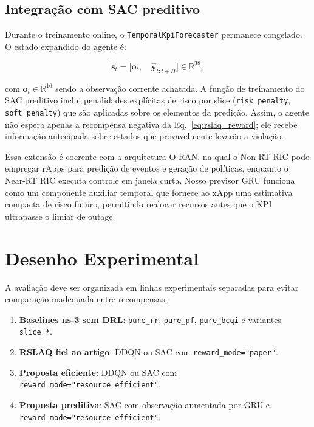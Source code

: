 \documentclass[10pt,a4paper]{IEEEtran}
\begin{document}
\subsection{Integra\c{c}\~{a}o com SAC preditivo}

Durante o treinamento online, o \texttt{TemporalKpiForecaster}
permanece congelado. O estado expandido do agente \'{e}:

\begin{equation}
\tilde{\mathbf{s}}_t = \big[
  \mathbf{o}_t, \quad \hat{\mathbf{y}}_{t:t+H}
\big] \in \mathbb{R}^{38},
\label{eq:augmented_state}
\end{equation}

com $\mathbf{o}_t \in \mathbb{R}^{16}$ sendo a observa\c{c}\~{a}o
corrente achatada. A fun\c{c}\~{a}o de treinamento do SAC
preditivo inclui penalidades expl\'{i}citas de risco por slice
(\texttt{risk\_penalty}, \texttt{soft\_penalty}) que s\~{a}o
aplicadas sobre os elementos da predi\c{c}\~{a}o. Assim, o
agente n\~{a}o espera apenas a recompensa negativa da
Eq.~\eqref{eq:rslaq_reward}; ele recebe informa\c{c}\~{a}o
antecipada sobre estados que provavelmente levar\~{a}o a
viola\c{c}\~{a}o.

Essa extens\~{a}o \'{e} coerente com a arquitetura O-RAN, na
qual o Non-RT RIC pode empregar rApps para predi\c{c}\~{a}o de
eventos e gera\c{c}\~{a}o de pol\'{i}ticas, enquanto o Near-RT
RIC executa controle em janela curta. Nosso previsor GRU
funciona como um componente auxiliar temporal que fornece ao
xApp uma estimativa compacta de risco futuro, permitindo
realocar recursos antes que o KPI ultrapasse o limiar de outage.

\section{Desenho Experimental}
\label{sec:experimental}

A avalia\c{c}\~{a}o deve ser organizada em linhas experimentais
separadas para evitar compara\c{c}\~{a}o inadequada entre
recompensas:

\begin{enumerate}
\item \textbf{Baselines ns-3 sem DRL}: \texttt{pure\_rr},
  \texttt{pure\_pf}, \texttt{pure\_bcqi} e variantes
  \texttt{slice\_*}.
\item \textbf{RSLAQ fiel ao artigo}: DDQN ou SAC com
  \texttt{reward\_mode="paper"}.
\item \textbf{Proposta eficiente}: DDQN ou SAC com
  \texttt{reward\_mode="resource\_efficient"}.
\item \textbf{Proposta preditiva}: SAC com observa\c{c}\~{a}o
  aumentada por GRU e \texttt{reward\_mode="resource\_efficient"}.
\end{enumerate}
\end{document}
